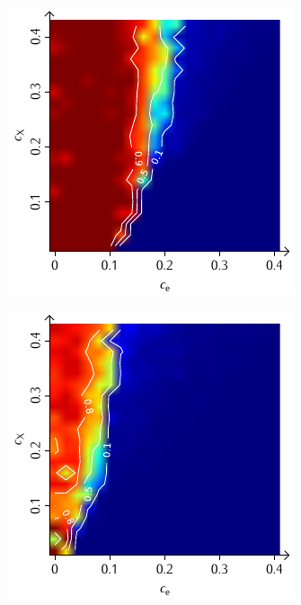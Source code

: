 \documentclass[a4paper, 10pt, twoside, openany]{book} %
\begin{document}
\begin{figure}
\begin{minipage}[t]{0.48\textwidth}
			\label{H_penalty_random_G}
		\end{minipage}
		\begin{minipage}[t]{0.48\textwidth}
			\includegraphics[width=\textwidth]{Abbildungen/Phasendiagramme/Konturen/H_individual_G.pdf}
			\label{H_individual_G}
		\end{minipage}
		\hfill
		\begin{minipage}[t]{0.48\textwidth}
			\includegraphics[width=\textwidth]{Abbildungen/Phasendiagramme/Konturen/H_penalty_individual_G.pdf}

\end{minipage}
\end{figure}
\end{document}

